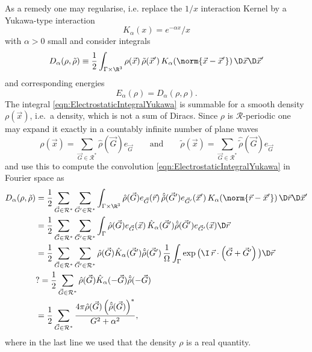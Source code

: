 \documentclass{MFHarticle}
\newcommand{\todoil}{\todo[caption={},inline]}
\begin{document}
As a remedy one may regularise, i.e. replace the $1/x$ interaction
Kernel by a Yukawa-type interaction
\[ K_\alpha(x) = e^{-\alpha x} / x \]
with $\alpha > 0$ small and consider integrals
\begin{equation}
	D_\alpha(\rho, \tilde{\rho}) \equiv
	\frac12
	\int_{\Gamma \times \R^3}
	\rho(\vec{x})\, \tilde{\rho}(\vec{x}')
	\,
	K_\alpha\!\left(\norm{\vec{x} - \vec{x}'}\right)
	\D\vec{x} \D\vec{x}'
	\label{eqn:ElectrostaticIntegralYukawa}
\end{equation}
and corresponding energies
\begin{equation}
	E_\alpha(\rho) = D_\alpha(\rho, \rho).
	\label{eqn:ElectrostaticEnergyYukawa}
\end{equation}
The integral
\eqref{eqn:ElectrostaticIntegralYukawa} is summable
for a smooth density $\rho(\vec{x})$,
i.e.~a density, which is not a sum of Diracs.
Since $\rho$ is $\mathcal{R}$-periodic one may expand it exactly
in a countably infinite number of plane waves
\[
	\rho(\vec{x}) = \sum_{\vec{G} \in \mathcal{R}^\ast}
		\hat{\rho}(\vec{G}) e_{\vec{G}}
		\qquad \text{and} \qquad
	\tilde{\rho}(\vec{x}) = \sum_{\vec{G} \in \mathcal{R}^\ast}
		\hat{\tilde{\rho}}(\vec{G}) e_{\vec{G}}
\]
and use this to compute the convolution \eqref{eqn:ElectrostaticIntegralYukawa}
in Fourier space as
\begin{align}
	\nonumber
	D_\alpha(\rho, \tilde{\rho}) &=
	\frac12
	\sum_{\vec{G} \in \mathcal{R}^\ast}
	\sum_{\vec{G}' \in \mathcal{R}^\ast}
	\int_{\Gamma \times \R^3}
	\hat{\rho}(\vec{G}) e_{\vec{G}}(\vec{r})
	\,
	\hat{\tilde{\rho}}(\vec{G}') e_{\vec{G}'}(\vec{x}')
	\,K_\alpha\!\left(\norm{\vec{r} - \vec{x}'}\right)
	\D\vec{r} \D\vec{x}' \\
	&=
	\nonumber
	\frac12
	\sum_{\vec{G} \in \mathcal{R}^\ast}
	\sum_{\vec{G}' \in \mathcal{R}^\ast}
	\int_{\Gamma}
	\hat{\rho}(\vec{G}) e_{\vec{G}}(\vec{x})
	\,
	\hat{K}_\alpha(\vec{G}') \hat{\tilde{\rho}}(\vec{G}') e_{\vec{G}'}(\vec{x})
	\D\vec{r} \\
	&=
	\nonumber
	\frac12
	\sum_{\vec{G} \in \mathcal{R}^\ast}
	\sum_{\vec{G}' \in \mathcal{R}^\ast}
	\hat{\rho}(\vec{G})
	\hat{K}_\alpha(\vec{G}') \hat{\tilde{\rho}}(\vec{G}')
	\, \frac{1}{\Omega} \int_{\Gamma}
	\exp\big(\I\, \vec{r} \cdot \left( \vec{G} + \vec{G}' \right)\big)
	\D\vec{r} \\
	&?=
	\nonumber
	\frac12
	\sum_{\vec{G} \in \mathcal{R}^\ast}
	\hat{\rho}(\vec{G})
	\hat{K}_\alpha(-\vec{G}) \hat{\tilde{\rho}}(-\vec{G})\\
	\label{eqn:ElectrostaticEnergyYukawaSeries}
	&=
	\frac12
	\sum_{\vec{G} \in \mathcal{R}^\ast}
	\frac{4\pi \hat{\rho}(\vec{G}) \left(\hat{\tilde{\rho}}(\vec{G})\right)^\ast}
	{G^2 + \alpha^2},
\end{align}
\todoil{One line not clear above.}
where in the last line we used that the density $\rho$ is a real quantity.
\end{document}

